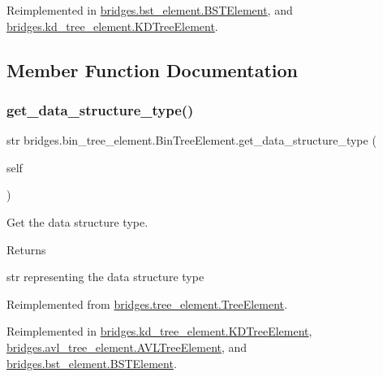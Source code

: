 Reimplemented in \mbox{\hyperlink{classbridges_1_1bst__element_1_1_b_s_t_element_a0be9b75a1da9322d40811669d13e05a4}{bridges.\+bst\+\_\+element.\+B\+S\+T\+Element}}, and \mbox{\hyperlink{classbridges_1_1kd__tree__element_1_1_k_d_tree_element_ad48f0bdabbb21cf83782efc1f8dbc1ed}{bridges.\+kd\+\_\+tree\+\_\+element.\+K\+D\+Tree\+Element}}.



\subsection{Member Function Documentation}
\mbox{\label{classbridges_1_1bin__tree__element_1_1_bin_tree_element_a9238744e18486fb8882238394f5efe7c}} 
\subsubsection{\texorpdfstring{get\_data\_structure\_type()}{get\_data\_structure\_type()}}
{\footnotesize\ttfamily  str bridges.\+bin\+\_\+tree\+\_\+element.\+Bin\+Tree\+Element.\+get\+\_\+data\+\_\+structure\+\_\+type (\begin{DoxyParamCaption}\item[{}]{self }\end{DoxyParamCaption})}



Get the data structure type. 

\begin{DoxyReturn}{Returns}


str representing the data structure type 
\end{DoxyReturn}


Reimplemented from \mbox{\hyperlink{classbridges_1_1tree__element_1_1_tree_element_a54a14bd74fe1f86dd73f90c57f88c10b}{bridges.\+tree\+\_\+element.\+Tree\+Element}}.



Reimplemented in \mbox{\hyperlink{classbridges_1_1kd__tree__element_1_1_k_d_tree_element_a4b38af960542ccc8c3b74d90ee9570e2}{bridges.\+kd\+\_\+tree\+\_\+element.\+K\+D\+Tree\+Element}}, \mbox{\hyperlink{classbridges_1_1avl__tree__element_1_1_a_v_l_tree_element_a811dd4cebd36fda6531f6cbeb873c0e5}{bridges.\+avl\+\_\+tree\+\_\+element.\+A\+V\+L\+Tree\+Element}}, and \mbox{\hyperlink{classbridges_1_1bst__element_1_1_b_s_t_element_a8e655e06ba0f77b7e2681b6d291f39de}{bridges.\+bst\+\_\+element.\+B\+S\+T\+Element}}.

